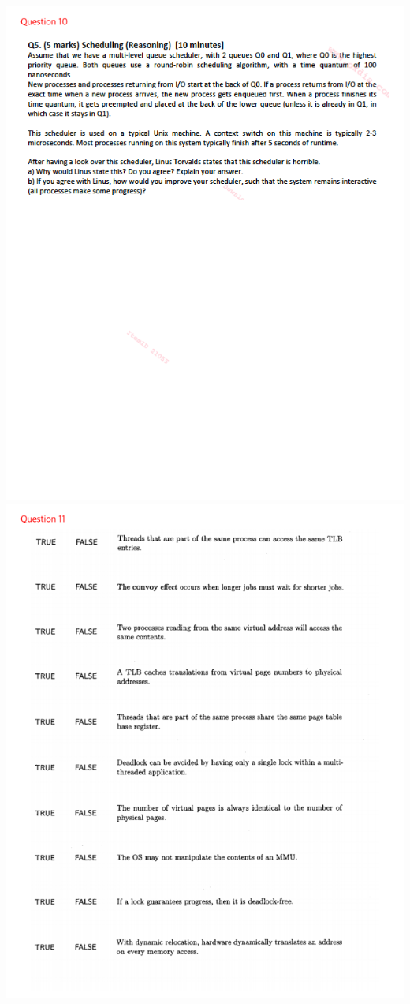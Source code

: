 \documentclass[12pt]{article}
\begin{document}
\begin{center}
    \includegraphics[width=\linewidth]{../images/midterm_5_10.png}
    \includegraphics[width=\linewidth]{../images/midterm_5_11.png}

\end{center}
\end{document}
